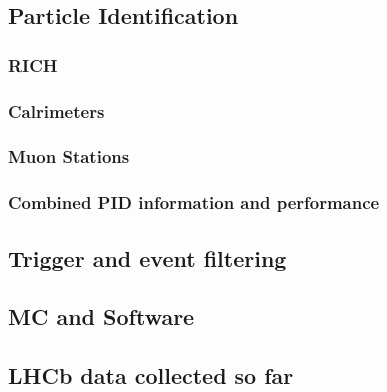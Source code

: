 \subsection{Particle Identification}
\subsubsection{RICH}
\subsubsection{Calrimeters}
\subsubsection{Muon Stations}
\subsubsection{Combined PID information and performance}

\subsection{Trigger and event filtering}

\subsection{MC and Software}

\subsection{LHCb data collected so far}

